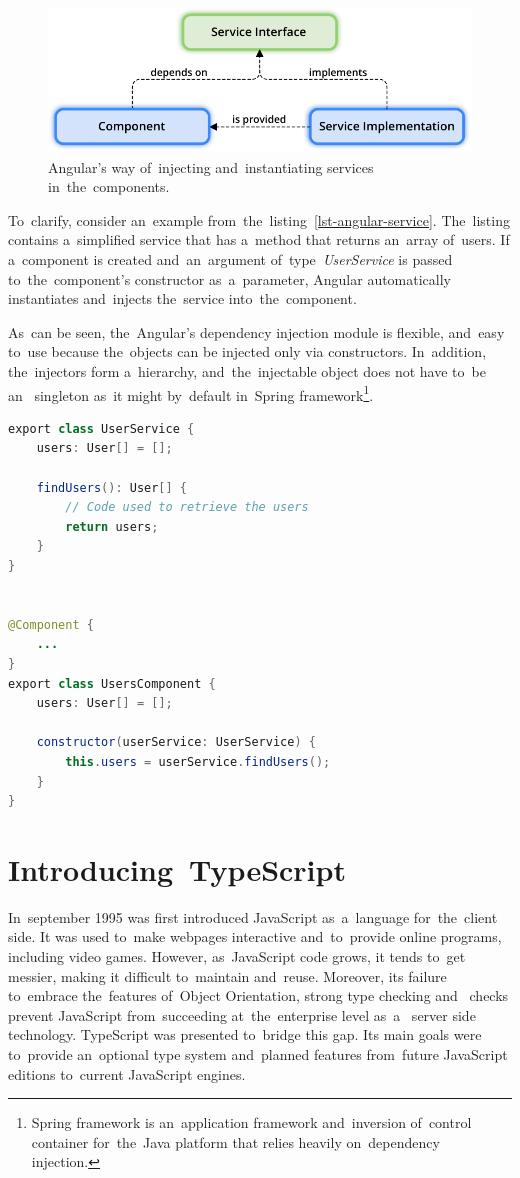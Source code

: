 \begin{figure}[!hbt]
	\centering
	\includegraphics[scale=0.8]{./figures/dependency-injection.pdf}
	\caption{Angular's way of~injecting and~instantiating services
	in~the~components.}
	\label{fig-dependency-injection}
\end{figure}

To~clarify, consider an~example from~the~listing~\ref{lst-angular-service}.
The~listing contains a~simplified service that has a~method that returns
an~array of~users. If a~component is created and~an~argument
of~type~\textit{UserService} is passed to~the~component's constructor
as~a~parameter, Angular automatically instantiates and~injects the~service
into~the~component. 

As~can be seen, the~Angular's dependency injection module is flexible, and~easy
to~use because the~objects can be injected only via constructors. In~addition,
the~injectors form a~hierarchy, and~the~injectable object does not have to~be
an~ singleton as~it might by~default in~Spring
framework\footnote{Spring framework is an~application framework and~inversion
of~control container for~the~Java platform that relies heavily on~dependency
injection.}.
\pagebreak

\begin{lstlisting}[caption=An~example of~dependency injection in~Angular.,
label=lst-angular-service, style=dp-default, language=Java]
export class UserService {
	users: User[] = [];
	
	findUsers(): User[] {
		// Code used to retrieve the users
		return users;
	}
}


@Component {
	...
}
export class UsersComponent {
	users: User[] = [];
	
	constructor(userService: UserService) {
		this.users = userService.findUsers();
	}
}
\end{lstlisting}


\section{Introducing~TypeScript}
\label{TypeScript}
In~september 1995 was first introduced JavaScript as~a~language for~the~client
side. It was used to~make webpages interactive and~to~provide online programs,
including video games. However, as~JavaScript code grows, it tends to~get
messier, making it difficult to~maintain and~reuse. Moreover, its failure
to~embrace the~features of~Object Orientation, strong type checking
and~ checks prevent JavaScript from~succeeding
at~the~enterprise level as~a~ server side technology.
TypeScript was presented to~bridge this gap. Its main goals were to~provide
an~optional type system and~planned features from~future JavaScript editions
to~current JavaScript engines.



